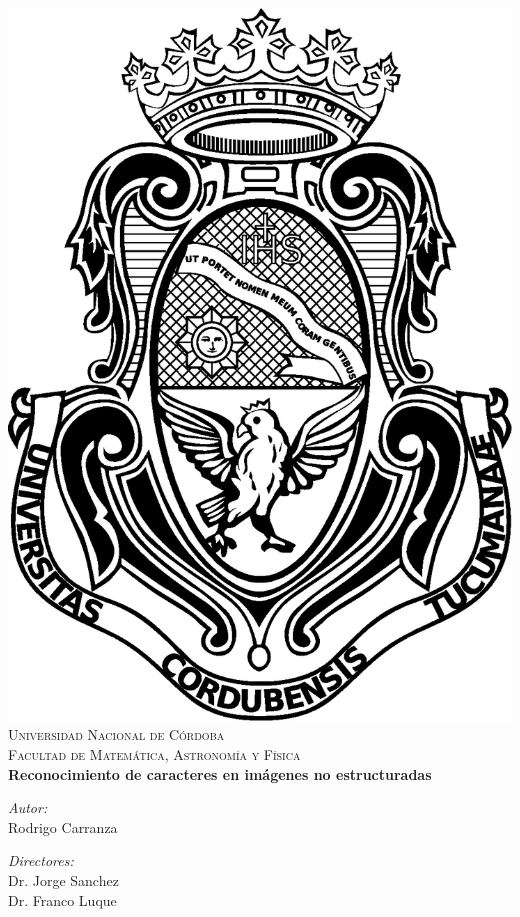 \begin{titlepage}
	\begin{center}
		\includegraphics[scale=0.23]{img/escudoUNC.eps}\\[1cm]
		\textsc{\LARGE Universidad Nacional de C\'{o}rdoba}\\[0.5cm]
		\textsc{\Large Facultad de Matem\'{a}tica, Astronom\'{i}a y F\'{i}sica}\\[3.5cm]
	
			{\doublespacing \LARGE \bfseries
				Reconocimiento de caracteres en im\'{a}genes no estructuradas
			} \\[4.5cm]

			
		\begin{minipage}{0.4\textwidth}
			\begin{flushleft} \large
				\emph{Autor:}\\
					Rodrigo Carranza
			\end{flushleft}
			\end{minipage}
			\begin{minipage}{0.4\textwidth}
				\begin{flushright} \large
					\emph{Directores:} \\
						Dr. Jorge Sanchez\\
						Dr. Franco Luque
				\end{flushright}
			\end{minipage}
	
			\vfill
		\end{center}
\end{titlepage}
